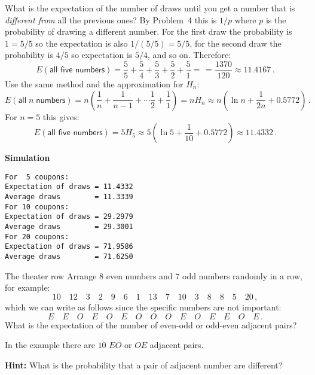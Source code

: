 \solution{}

 What is the expectation of the number of draws until you get a  number that is \emph{different from} all the previous ones? By  Problem~4 this is $1/p$ where $p$ is the probability of drawing a different number. For the first draw the probability is $1=5/5$ so the expectation is also $1/(5/5)=5/5$, for the second draw the probability is $4/5$ so expectation is $5/4$, and so on. Therefore:
\[
E(\textsf{all five numbers}) = \frac{5}{5}+\frac{5}{4} + \frac{5}{3} + \frac{5}{2} + \frac{5}{1} = \frac{}{} =\frac{1370}{120}\approx 11.4167\,.
\]
 Use the same method and the approximation for $H_n$:
\[
E(\textsf{all}\;n \;\textsf{numbers}) = n\left(\frac{1}{n}+\frac{1}{n-1} + \cdots \frac{1}{2} + \frac{1}{1}\right) =nH_n\approx n\left(\ln n + \frac{1}{2n} + 0.5772\right)\,. 
\]
For $n=5$ this gives:
\[
E(\textsf{all five numbers}) =5H_5\approx 5(\ln 5 + \frac{1}{10} + 0.5772) \approx 11.4332\,.
\]

\textbf{Simulation}
\begin{verbatim}
For  5 coupons:
Expectation of draws = 11.4332
Average draws        = 11.3339
For 10 coupons:
Expectation of draws = 29.2979
Average draws        = 29.3001
For 20 coupons:
Expectation of draws = 71.9586
Average draws        = 71.6250
\end{verbatim}


\begin{prob}{The theater row}
Arrange $8$ even numbers and $7$ odd numbers randomly in a row, for example:
\[
10\quad 12\quad 3\quad 2\quad 9\quad 6 \quad 1\quad 13\quad 7\quad 10\quad 3\quad 8\quad 8\quad 5\quad 20\,,
\]
which we can write as follows since the specific numbers are not important:
\[
E\quad E\quad O\quad E\quad O\quad E \quad O\quad O\quad O\quad E\quad O\quad E\quad E\quad O\quad E\,.
\]
What is the expectation of the number of even-odd or odd-even adjacent pairs?

In the example there are $10$ $EO$ or $OE$ adjacent pairs.

\textbf{Hint:} What is the probability that a pair of adjacent number are different?
\end{prob}

\solution{}

